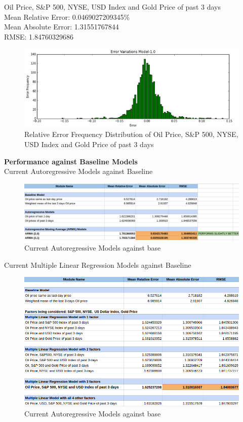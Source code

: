 \documentclass[runningheads]{llncs}
\begin{document}
Oil Price, S\&P 500, NYSE, USD Index and Gold Price of past 3 days \\ 
Mean Relative Error: 0.0469027209345\% \\
Mean Absolute Error: 1.31551767844 \\
RMSE: 1.84760329686 \\
\begin{figure}
\centering
\includegraphics[width=\textwidth]{OILSP500NYSEUSDGOLD_Daily.png}
\caption{Relative Error Frequency Distribution of Oil Price, S\&P 500, NYSE, USD Index and Gold Price of past 3 days}
\label{fig:OILSP500NYSEUSDGOLD_Daily.png}
\end{figure}

\noindent\textbf{Performance against Baseline Models} \\
Current Autoregressive Models against Baseline \\
\begin{figure}
\centering
\includegraphics[width=\textwidth]{OILAutoAgainstBase_Daily.png}
\caption{Current Autoregressive Models against base}
\label{fig:OILAutoAgainstBase_Daily.png}
\end{figure}

Current Multiple Linear Regression Models against Baseline \\
\begin{figure}
\centering
\includegraphics[width=\textwidth]{OILMLRAgainstBase_Daily.png}
\caption{Current Autoregressive Models against base}
\label{fig:OILMLRAgainstBase_Daily.png}
\end{figure}
\end{document}
